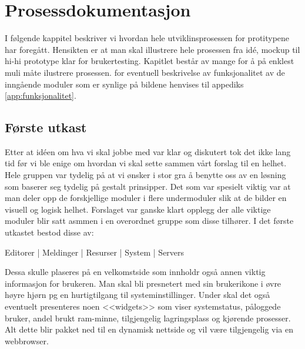 \chapter{Prosessdokumentasjon}
\lettrine[lines=2]{I}{} følgende kappitel beskriver vi hvordan hele utviklinsprosessen for protitypene har foregått. Hensikten er at man skal illustrere hele prosessen fra idé, mockup til hi-hi prototype klar for brukertesting. Kapitlet består av mange for å på enklest muli måte ilustrere prosessen. for eventuell beskrivelse av funksjonalitet av de inngående moduler som er synlige på bildene henvises til appediks \ref{app:funksjonalitet}.




\section{Første utkast}
Etter at idéen om hva vi skal jobbe med var klar og diskutert tok det ikke lang tid før vi ble enige om hvordan vi skal sette sammen vårt forslag til en helhet. Hele gruppen var tydelig på at vi ønsker i stor gra å benytte oss av en løsning som baserer seg tydelig på gestalt prinsipper.
Det som var spesielt viktig var at man deler opp de forskjellige moduler i flere undermoduler slik at de bilder en visuell og logisk helhet. 
Forslaget var ganske klart opplegg der alle viktige moduler blir satt asmmen i en overordnet gruppe som disse tilhører. I det første utkastet bestod disse av:
\begin{center}
Editorer | Meldinger | Resurser | System | Servers
\end{center}
Dessa skulle plaseres på en velkomstside som innholdr også annen viktig informasjon for brukeren. Man skal bli presnetert med sin brukerikone i øvre høyre hjørn pg en hurtigtilgang til systeminstillinger. Under skal det også eventuelt presenteres noen <<widgets>> som viser systemstatus, påloggede bruker, andel brukt ram-minne, tilgjengelig lagringsplass og kjørende prosesser. Alt dette blir pakket ned til en dynamisk nettside og vil være tilgjengelig via en webbrowser.





